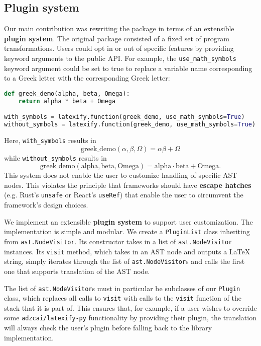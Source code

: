 \documentclass{article}
\newcommand{\ourpkg}{\texttt{adzcai/latexify-py}}
\newcommand{\vocab}[1]{\textbf{#1}}
\begin{document}
\subsection{Plugin system}
\label{sec:plugins}

Our main contribution was rewriting the package in terms of an extensible \vocab{plugin system}.
The original package consisted of a fixed set of program transformations.
Users could opt in or out of specific features by providing keyword arguments to the public API.
For example,
the \verb|use_math_symbols| keyword argument could be set to true
to replace a variable name corresponding to a Greek letter
with the corresponding Greek letter:
\begin{lstlisting}[language=Python]
def greek_demo(alpha, beta, Omega):
    return alpha * beta + Omega

with_symbols = latexify.function(greek_demo, use_math_symbols=True)
without_symbols = latexify.function(greek_demo, use_math_symbols=True)
\end{lstlisting}
Here, \verb|with_symbols| results in
\[
\displaystyle \mathrm{greek\_demo}(\alpha, \beta, \Omega) = \alpha \beta + \Omega
\]
while \verb|without_symbols| results in
\[
\displaystyle \mathrm{greek\_demo}(\mathrm{alpha}, \mathrm{beta}, \mathrm{Omega}) = \mathrm{alpha} \cdot \mathrm{beta} + \mathrm{Omega}.
\]
This system does not enable the user to customize handling of specific AST nodes.
This violates the principle that frameworks should have \vocab{escape hatches}
(e.g. Rust's \verb|unsafe| or React's \verb|useRef|)
that enable the user to circumvent the framework's design choices.

We implement an extensible \vocab{plugin system} to support user customization.
The implementation is simple and modular.
We create a \verb|PluginList| class inheriting from \verb|ast.NodeVisitor|.
Its constructor takes in a list of \verb|ast.NodeVisitor| instances.
Its \verb|visit| method,
which takes in an AST node and outputs a \LaTeX{} string,
simply iterates through the list of \verb|ast.NodeVisitor|s and calls the first one that supports translation of the AST node.

The list of \verb|ast.NodeVisitor|s must in particular be subclasses of our \verb|Plugin| class,
which replaces all calls to \verb|visit| with calls to the \verb|visit| function of the stack that it is part of.
This ensures that, for example,
if a user wishes to override some \ourpkg{} functionality by providing their plugin,
the translation will always check the user's plugin before falling back to the library implementation.
\end{document}
